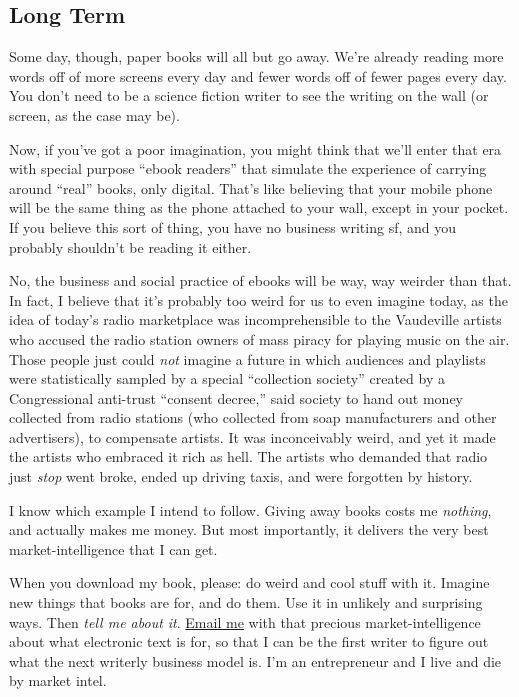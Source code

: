 \documentclass{article}
\begin{document}
\subsection{Long Term}

Some day, though, paper books will all but go away.  We're already
reading more words off of more screens every day and fewer words off
of fewer pages every day.  You don't need to be a science fiction
writer to see the writing on the wall (or screen, as the case may be).

Now, if you've got a poor imagination, you might think that we'll
enter that era with special purpose ``ebook readers'' that simulate
the experience of carrying around ``real'' books, only digital. 
That's like believing that your mobile phone will be the same thing as
the phone attached to your wall, except in your pocket.  If you
believe this sort of thing, you have no business writing sf, and you
probably shouldn't be reading it either.

No, the business and social practice of ebooks will be way, way
weirder than that.  In fact, I believe that it's probably too weird
for us to even imagine today, as the idea of today's radio marketplace
was incomprehensible to the Vaudeville artists who accused the radio
station owners of mass piracy for playing music on the air.  Those
people just could \textit{not} imagine a future in which audiences and
playlists were statistically sampled by a special ``collection
society'' created by a Congressional anti-trust ``consent decree,''
said society to hand out money collected from radio stations (who
collected from soap manufacturers and other advertisers), to
compensate artists.  It was inconceivably weird, and yet it made the
artists who embraced it rich as hell.  The artists who demanded that
radio just \textit{stop} went broke, ended up driving taxis, and were
forgotten by history. 

I know which example I intend to follow.  Giving away books costs me
\textit{nothing}, and actually makes me money.  But most importantly,
it delivers the very best market-intelligence that I can get. 

When you download my book, please:  do weird and cool stuff with it. 
Imagine new things that books are for, and do them.  Use it in
unlikely and surprising ways.  Then \textit{tell me about it}. 
\href{mailto:doctorow@craphound.com}{Email me} with that precious
market-intelligence about what electronic text is for, so that I can
be the first writer to figure out what the next writerly business
model is.  I'm an entrepreneur and I live and die by market intel.
\end{document}
